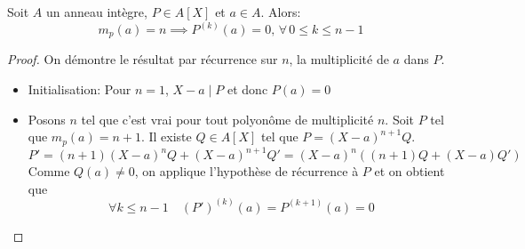 \begin{lemma}
	Soit $A$ un anneau intègre, $P \in A[X]$ et $a \in A$.
	Alors:
	$$ m_p(a) = n \implies P^{(k)}(a) = 0 , \, \forall\, 0 \leq k \leq n-1$$
\end{lemma}

\begin{proof}
	On démontre le résultat par récurrence sur $n$, la multiplicité de $a$ dans $P$.
	\begin{itemize}
		\item Initialisation: Pour $n = 1$, $X-a \mid P$ et donc $P(a) = 0$
		\item Posons $n$ tel que c'est vrai pour tout polyonôme de multiplicité $n$.
		      Soit $P$ tel que $m_p(a) = n+1$. Il existe $Q \in A[X]$ tel que $P = (X-a)^{n+1}Q$.
		      $$P' = (n+1)(X-a)^nQ + (X-a)^{n+1}Q' = (X-a)^n((n+1)Q + (X-a)Q')$$
		      Comme $Q(a) \neq 0$, on applique l'hypothèse de récurrence à $P$ et on obtient que
		      $$ \forall k \leq n-1 \quad (P')^{(k)}(a) = P^{(k+1)}(a) = 0 $$
	\end{itemize}
\end{proof}


